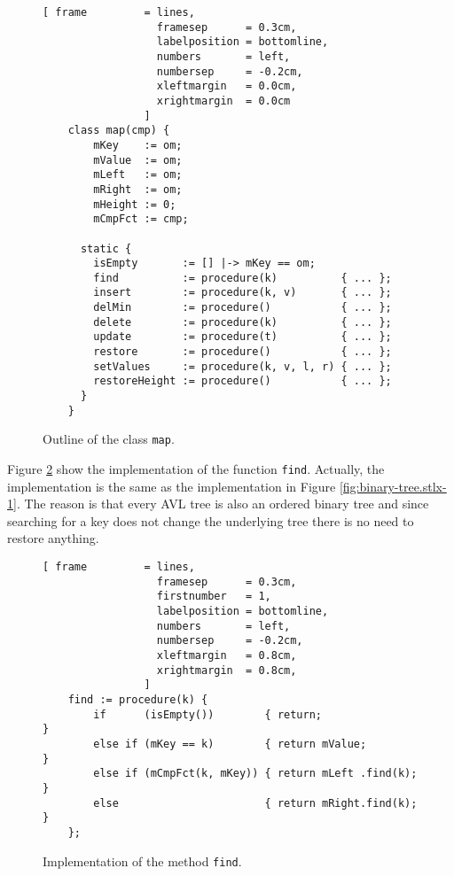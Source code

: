 \begin{figure}[!ht]
  \centering
\begin{Verbatim}[ frame         = lines, 
                  framesep      = 0.3cm, 
                  labelposition = bottomline,
                  numbers       = left,
                  numbersep     = -0.2cm,
                  xleftmargin   = 0.0cm,
                  xrightmargin  = 0.0cm
                ]
    class map(cmp) {
        mKey    := om;
        mValue  := om; 
        mLeft   := om;
        mRight  := om;
        mHeight := 0;
        mCmpFct := cmp;  
    
      static {
        isEmpty       := [] |-> mKey == om;
        find          := procedure(k)          { ... };
        insert        := procedure(k, v)       { ... };
        delMin        := procedure()           { ... };
        delete        := procedure(k)          { ... };
        update        := procedure(t)          { ... };
        restore       := procedure()           { ... };
        setValues     := procedure(k, v, l, r) { ... };
        restoreHeight := procedure()           { ... };
      }
    }
\end{Verbatim}
\vspace*{-0.3cm}
  \caption{Outline of the class \texttt{map}.}
  \label{fig:avl-tree.stlx:outline}
\end{figure}


Figure \ref{fig:avl-tree.stlx:find} show the implementation of the function \texttt{find}.
Actually, the implementation is the same as the implementation in Figure
\ref{fig:binary-tree.stlx-1}.  The reason is that every AVL tree is also an ordered binary tree and
since searching for a key does not change the underlying tree there is no need to restore anything.

\begin{figure}[!ht]
\centering
\begin{Verbatim}[ frame         = lines, 
                  framesep      = 0.3cm, 
                  firstnumber   = 1,
                  labelposition = bottomline,
                  numbers       = left,
                  numbersep     = -0.2cm,
                  xleftmargin   = 0.8cm,
                  xrightmargin  = 0.8cm,
                ]
    find := procedure(k) {
        if      (isEmpty())        { return;                }
        else if (mKey == k)        { return mValue;         }
        else if (mCmpFct(k, mKey)) { return mLeft .find(k); }
        else                       { return mRight.find(k); }
    };
\end{Verbatim}
\vspace*{-0.3cm}
\caption{Implementation of the method \texttt{find}.}
\label{fig:avl-tree.stlx:find}
\end{figure}


